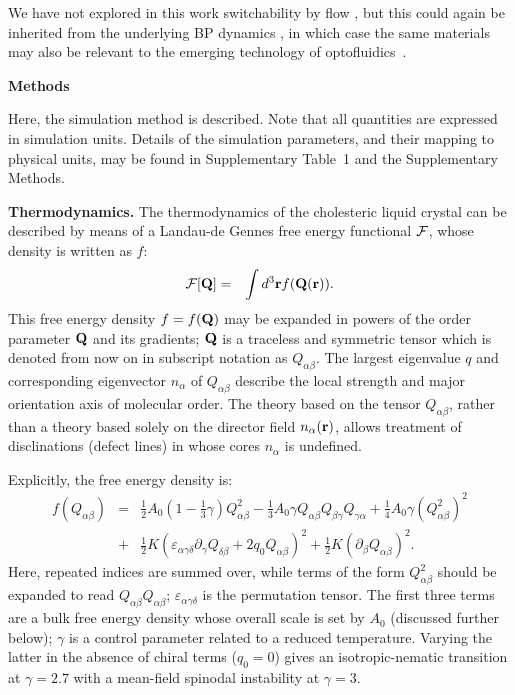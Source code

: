 \documentclass[12pt]{article}
\begin{document}
We have not explored in this work switchability by flow \cite{flowswitch}, but this could again be inherited from the underlying BP dynamics \cite{adriano,permeation2}, in which case the same materials may also be relevant to the emerging technology of optofluidics~\cite{optofluidics}.


\bigskip
\noindent
\textbf{\large Methods}

Here, the simulation method is described. Note that
all quantities are expressed in simulation units. Details
of the simulation parameters, and their mapping to physical units,
may be found in Supplementary Table~1 and the Supplementary Methods.

\medskip
\noindent
\textbf{Thermodynamics.}
The thermodynamics of the cholesteric liquid crystal can be described
by means of a  Landau-de Gennes free energy functional $\cal F$,
whose density is written as $f$:
\begin{eqnarray}
{\cal F}[{\bf Q}]&=&\int d^3{\bf r} f({\bf Q}({\bf r})).
\end{eqnarray}
This free energy density $f = f({\bf Q})$ may be expanded in powers of the
order parameter ${\bf Q}$ and its gradients; ${\bf Q}$ is a traceless 
and symmetric tensor which is denoted from now on in subscript
notation as $Q_{\alpha\beta}$.
The largest eigenvalue $q$ and corresponding eigenvector $n_\alpha$
of $Q_{\alpha\beta}$ describe the local strength and major orientation axis
of molecular order.
The theory based on the tensor $Q_{\alpha\beta}$, rather than a theory based
solely
on the director field $n_\alpha ({\bf r})$, allows treatment of disclinations
(defect lines) in whose cores $n_\alpha$ is undefined.

Explicitly, the free energy density is:
\begin{eqnarray}
f(Q_{\alpha\beta}) &=& {\textstyle \frac{1}{2}} A_0
 \left(1- {\textstyle \frac{1}{3}}\gamma \right)Q^2_{\alpha \beta}
-{\textstyle \frac{1}{3}}A_0\gamma Q_{\alpha \beta} Q_{\beta \gamma}Q_{\gamma \alpha} 
+ {\textstyle \frac{1}{4}} A_0\gamma (Q^2_{\alpha \beta})^2  \nonumber\\
&+& {\textstyle \frac{1}{2}} K(\varepsilon_{\alpha \gamma \delta}
\partial_\gamma Q_{\delta \beta} + 2 q_0 Q_{\alpha \beta})^2
+ {\textstyle \frac{1}{2}} K (\partial_\beta Q_{\alpha \beta})^2.
\label{free}
\end{eqnarray}
Here, repeated indices are summed over, while terms of the form
$Q^2_{\alpha\beta}$ should be expanded to read $Q_{\alpha\beta}Q_{\alpha\beta}$;
$\varepsilon_{\alpha\gamma\delta}$ is the permutation tensor.
The first three terms are a bulk free energy density whose overall scale
is set by $A_0$ (discussed further below); $\gamma$ is a control parameter
related to a reduced temperature. Varying the latter in the absence of
chiral terms ($q_0=0$) gives an isotropic-nematic transition at
$\gamma = 2.7$ with a mean-field spinodal instability at $\gamma = 3$.
\end{document}

